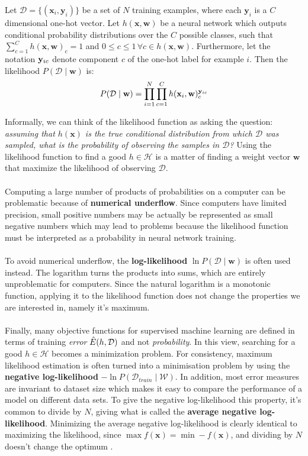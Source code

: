 \begin{definition}
	\label{likelihood}
	Let $\mathcal{D} = \{(\mathbf{x}_i, \mathbf{y}_i)\}$ be a set of $N$ training examples, where each $\mathbf{y}_i$ is a $C$ dimensional one-hot vector. Let $h(\mathbf{x}, \mathbf{w})$ be a neural network which outputs conditional probability distributions over the $C$ possible classes, such that $\sum_{c=1}^C h(\mathbf{x}, \mathbf{w})_c = 1$ and $0 \leq c \leq 1 \,\forall c \in h(\mathbf{x}, \mathbf{w})$. Furthermore, let the notation $\mathbf{y}_{ic}$ denote component $c$ of the one-hot label for example $i$. Then the likelihood $P(\mathcal{D} \mid \mathbf{w})$ is:
	$$
	P(\mathcal{D} \mid \mathbf{w}) = \prod\limits_{i=1}^N\prod\limits_{c=1}^C h(\mathbf{x}_i, \mathbf{w})_c^{\mathbf{y}_{ic}}
	$$
\end{definition}
\noindent
Informally, we can think of the likelihood function as asking the question: \textit{assuming that $h(\mathbf{x})$ is the true conditional distribution from which $\mathcal{D}$ was sampled, what is the probability of observing the samples in $\mathcal{D}$?} Using the likelihood function to find a good $h \in \mathcal{H}$ is a matter of finding a weight vector $\mathbf{w}$ that maximize the likelihood of observing $\mathcal{D}$.
\\\\ 
Computing a large number of products of probabilities on a computer can be problematic because of \textbf{numerical underflow}. Since computers have limited precision, small positive numbers may be actually be represented as small negative numbers which may lead to problems because the likelihood function must be interpreted as a probability in neural network training.
\\\\
To avoid numerical underflow, the \textbf{log-likelihood} $\ln P(\mathcal{D} \mid \mathbf{w})$ is often used instead. The logarithm turns the products into sums, which are entirely unproblematic for computers. Since the natural logarithm is a monotonic function, applying it to the likelihood function does not change the properties we are interested in, namely it's maximum.
\\\\
Finally, many objective functions for supervised machine learning are defined in terms of training \emph{error} $\hat{E}(h, \mathcal{D})$ and not \emph{probability}. In this view, searching for a good $h \in \mathcal{H}$ becomes a minimization problem. For consistency, maximum likelihood estimation is often turned into a minimisation problem by using the \textbf{negative log-likelihood} $-\ln P(\mathcal{D}_{train} \mid \mathcal{W})$. In addition, most error measures are invariant to dataset size which makes it easy to compare the performance of a model on different data sets. To give the negative log-likelihood this property, it's common to divide by $N$, giving what is called the \textbf{average negative log-likelihood}. Minimizing the average negative log-likelihood is clearly identical to maximizing the likelihood, since $\max f(\mathbf{x}) = \min -f(\mathbf{x})$, and dividing by $N$ doesn't change the optimum \citep{goodfellow16}.

